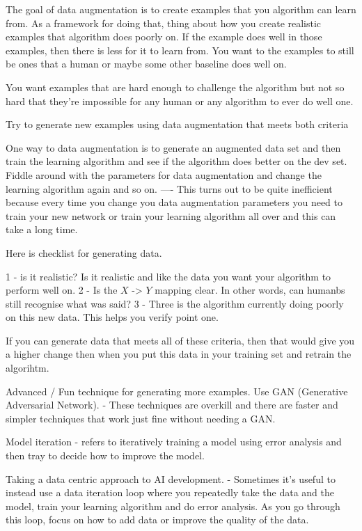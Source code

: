 The goal of data augmentation is to create examples that you algorithm can learn from.
As a framework for doing that, thing about how you create realistic examples that algorithm does poorly on.
If the example does well in those examples, then there is less for it to learn from.
You want to the examples to still be ones that a human or maybe some other baseline does well on.

You want examples that are hard enough to challenge the algorithm but not so hard that they're impossible for any human or any algorithm to ever do well one.

Try to generate new examples using data augmentation that meets both criteria

One way to data augmentation is to generate an augmented data set and then train the learning algorithm and see if the algorithm does better on the dev set.
Fiddle around with the parameters for data augmentation and change the learning algorithm again and so on.
---- This turns out to be quite inefficient because every time you change you data augmentation parameters you need to train your new network or train your learning algorithm all over and this can take a long time.


Here is checklist for generating data.

1 - is it realistic? Is it realistic and like the data you want your algorithm to perform well on.
2 - Is the $X$ -> $Y$ mapping clear. In other words, can humanbs still recognise what was said?
3 - Three is the algorithm currently doing poorly on this new data. This helps you verify point one.

If you can generate data that meets all of these criteria, then that would give you a higher change then when you put this data in your training set and retrain the algorihtm.

Advanced / Fun technique for generating more examples.
Use GAN (Generative Adversarial Network).
- These techniques are overkill and there are faster and simpler techniques that work just fine without needing a GAN.

Model iteration - refers to iteratively training a model using error analysis and then tray to decide how to improve the model.

Taking a data centric approach to AI development.
- Sometimes it's useful to instead use a data iteration loop where you repeatedly take the data and the model, train your learning algorithm and do error analysis.
As you go through this loop, focus on how to add data or improve the quality of the data.

